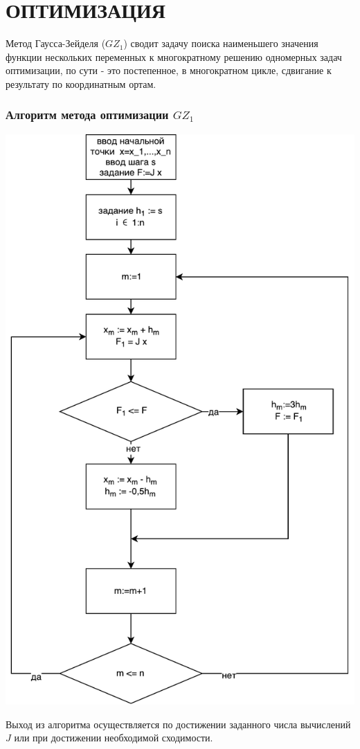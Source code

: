 \newpage
\part{ОПТИМИЗАЦИЯ}
    Метод Гаусса-Зейделя ($GZ_1$) сводит задачу поиска наименьшего значения функции нескольких переменных к многократному решению одномерных задач оптимизации, по сути - это постепенное, в многократном цикле, сдвигание к результату по координатным ортам.
    \section*{Алгоритм метода оптимизации $GZ_1$}
        \begin{center}
            \includegraphics[scale=0.7]{img/gz1-alg}
        \end{center}
        Выход из алгоритма осуществляется по достижении заданного числа вычислений $J$ или при достижении необходимой сходимости.

